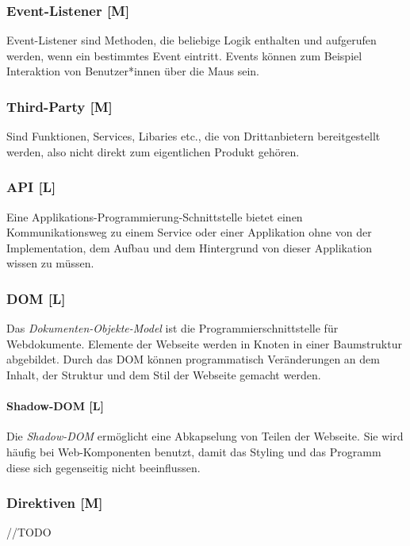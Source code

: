 \subsubsection{Event-Listener [M]}
\label{txt:glos:event-listener}
Event-Listener sind Methoden, die beliebige Logik enthalten und aufgerufen werden, wenn ein bestimmtes Event eintritt. Events können zum Beispiel Interaktion von Benutzer*innen über die Maus sein. 

\subsubsection{Third-Party [M]}
Sind Funktionen, Services, Libaries etc., die von Drittanbietern bereitgestellt werden, also nicht direkt zum eigentlichen Produkt gehören. 

\subsubsection{API [L]}
\label{txt:glos:API}
Eine Applikations-Programmierung-Schnittstelle bietet einen Kommunikationsweg zu einem Service oder einer Applikation ohne von der Implementation, dem Aufbau und dem Hintergrund von dieser Applikation wissen zu müssen. \cite{WhatApi}

\subsubsection{DOM [L]}
Das \emph{Dokumenten-Objekte-Model} ist die Programmierschnittstelle für Webdokumente. Elemente der Webseite werden in Knoten in einer Baumstruktur abgebildet. Durch das DOM können programmatisch Veränderungen an dem Inhalt, der Struktur und dem Stil der Webseite gemacht werden. \cite{WhatDOM}

\paragraph{Shadow-DOM [L]}
Die \emph{Shadow-DOM} ermöglicht eine Abkapselung von Teilen der Webseite. Sie wird häufig bei Web-Komponenten benutzt, damit das Styling und das Programm diese sich gegenseitig nicht beeinflussen. \cite{WhatShadowDOM}


\subsubsection{Direktiven [M]}
//TODO

